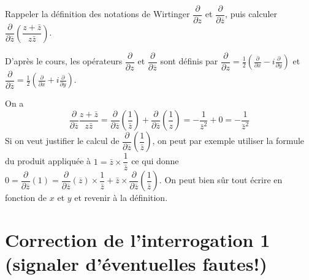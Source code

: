 \begin{exo}
Rappeler la définition des notations de Wirtinger $\dfrac{\partial}{\partial z}$ et $\dfrac{\partial}{\partial \overline z}$, puis calculer $\dfrac{\partial}{\partial \overline z}\left(\dfrac{z+\bar z}{z\bar z}\right)$.
\begin{sol}
D'après le cours, les opérateurs $\dfrac{\partial}{\partial z}$ et $\dfrac{\partial}{\partial \overline z}$ sont définis par 
$\dfrac{\partial}{\partial z} = \frac12 \left(\frac{\partial}{\partial x}-i\frac{\partial}{\partial y}\right)$ et$\dfrac{\partial}{\partial \overline z} = \frac12 \left(\frac{\partial}{\partial x}+i\frac{\partial}{\partial y}\right)$.

On a  
\[ 
\dfrac{\partial}{\partial \overline z}\dfrac{z+\bar z}{z\bar z}
=\dfrac{\partial}{\partial \overline z}\left(\dfrac{1}{\bar z}\right)+\dfrac{\partial}{\partial \overline z}\left(\dfrac{1}{z}\right)
= -\dfrac{1}{\bar z^2}+0 
=-\dfrac{1}{\bar z^2} \]
Si on veut justifier le calcul de $\dfrac{\partial}{\partial \overline z}\left(\dfrac{1}{\bar z}\right)$, on peut par exemple utiliser la formule du produit appliquée à $1=\bar z \times \dfrac{1}{\bar z}$ ce qui donne $0 = \dfrac{\partial}{\partial \overline z} (1) = \dfrac{\partial}{\partial \overline z} (\overline z) \times \dfrac{1}{\bar z} + \bar z \times \dfrac{\partial}{\partial \overline z} \left(\dfrac{1}{\bar z}\right)$. On peut bien sûr tout écrire en fonction de $x$ et $y$ et revenir à la définition.
\end{sol}
\end{exo}







\newpage
\section*{Correction de l'interrogation 1 (signaler d'éventuelles fautes!)}



